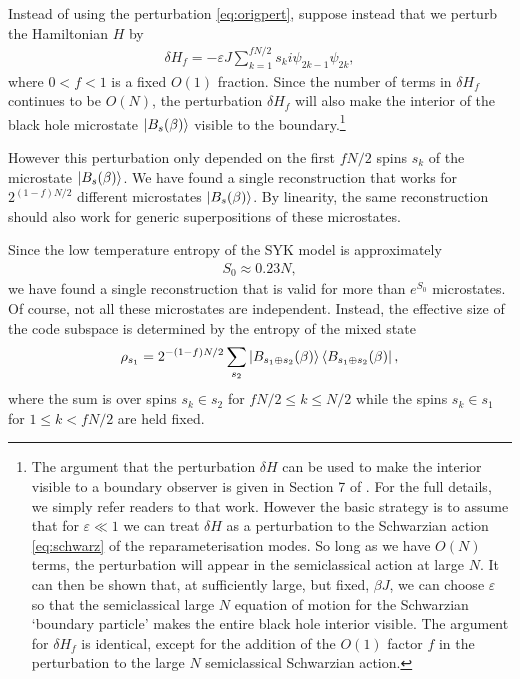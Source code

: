 \documentclass[11pt,a4paper]{article}
\begin{document}
Instead of using the perturbation \eqref{eq:origpert}, suppose instead that we perturb the Hamiltonian $H$ by
\begin{align}
\delta H_f = - \varepsilon J  \sum_{k=1}^{f N/2} s_k i \psi_{2k-1} \psi_{2k},
\end{align}
where $0 < f < 1$ is a fixed $O(1)$ fraction. Since the number of terms in $\delta H_f$ continues to be $O(N)$,  the perturbation $\delta H_f$ will also make the interior of the black hole microstate $\ket{B_s(\beta)}$ visible to the boundary.\footnote{The argument that the perturbation $\delta H$ can be used to make the interior visible to a boundary observer is given in Section 7 of \cite{kourkoulou2017pure}. For the full details, we simply refer readers to that work. However the basic strategy is to assume that for $\varepsilon \ll 1$ we can treat $\delta H$ as a perturbation to the Schwarzian action \eqref{eq:schwarz} of the reparameterisation modes. So long as we have $O(N)$ terms, the perturbation will appear in the semiclassical action at large $N$. It can then be shown that, at sufficiently large, but fixed, $\beta J$, we can choose $\varepsilon$ so that the semiclassical large $N$ equation of motion for the Schwarzian `boundary particle' makes the entire black hole interior visible. The argument for $\delta H_f$ is identical, except for the addition of the $O(1)$ factor $f$ in the perturbation to the large $N$ semiclassical Schwarzian action.}

However this perturbation only depended on the first $f N/2$ spins $s_k$ of the microstate $\ket{B_s(\beta)}$. We have found a single reconstruction that works for $2^{(1-f)N/2}$ different microstates $\ket{B_s(\beta)}$. By linearity, the same reconstruction should also work for generic superpositions of these microstates.
 
Since the low temperature entropy of the SYK model is approximately
\begin{align}
S_0 \approx 0.23 N, 
\end{align}
we have found a single reconstruction that is valid for more than $e^{S_0}$ microstates. Of course, not all these microstates are independent. Instead, the effective size of the code subspace is determined by the entropy of the mixed state
\begin{align} \label{eq:mixture}
 \rho_{s_1} = 2^{-(1-f)N/2} \sum_{s_2} \ket{B_{s_1 \oplus s_2}(\beta)} \bra{B_{s_1 \oplus s_2}(\beta)}, 
\end{align}
where the sum is over spins $s_k \in s_2$ for $f N/2 \leq k \leq N /2$ while the spins $s_k \in s_1$ for $1 \leq k < f N/2$ are held fixed.
\end{document}

